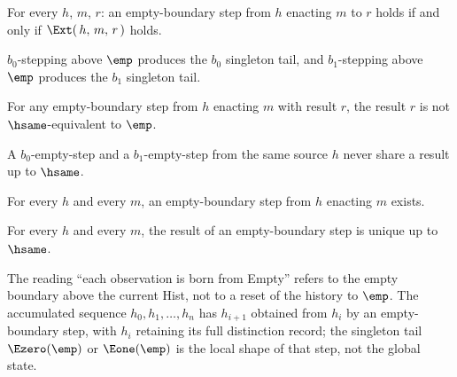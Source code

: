 \begin{theorem}
\label{thm:efm-empty-step-iff-ext}
For every $h$, $m$, $r$: an empty-boundary step from $h$ enacting $m$ to $r$ holds if and only if $\Ext(\,h,\,m,\,r\,)$ holds.
\end{theorem}

\begin{theorem}
\label{thm:efm-singleton-tail-construct}
$b_0$-stepping above $\emp$ produces the $b_0$ singleton tail, and $b_1$-stepping above $\emp$ produces the $b_1$ singleton tail.
\end{theorem}

\begin{theorem}
\label{thm:efm-empty-step-result-nonempty}
For any empty-boundary step from $h$ enacting $m$ with result $r$, the result $r$ is not $\hsame$-equivalent to $\emp$.
\end{theorem}

\begin{theorem}
\label{thm:efm-empty-step-cross-mark-noconf}
A $b_0$-empty-step and a $b_1$-empty-step from the same source $h$ never share a result up to $\hsame$.
\end{theorem}

\begin{theorem}
\label{thm:efm-empty-step-total}
For every $h$ and every $m$, an empty-boundary step from $h$ enacting $m$ exists.
\end{theorem}

\begin{theorem}
\label{thm:efm-empty-step-det}
For every $h$ and every $m$, the result of an empty-boundary step is unique up to $\hsame$.
\end{theorem}

\begin{remark}
\label{rem:efm-no-reset}
The reading ``each observation is born from Empty'' refers to the empty boundary above the current Hist, not to a reset of the history to $\emp$. The accumulated sequence $h_0, h_1, \dots, h_n$ has $h_{i+1}$ obtained from $h_i$ by an empty-boundary step, with $h_i$ retaining its full distinction record; the singleton tail $\Ezero(\emp)$ or $\Eone(\emp)$ is the local shape of that step, not the global state.
\end{remark}

